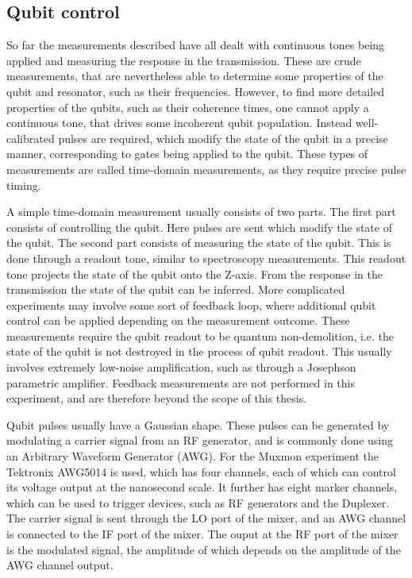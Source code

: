       \subsection{Qubit control}
        \label{ssec:qubit control}
        So far the measurements described have all dealt with continuous tones being applied and measuring the response in the transmission. These are crude measurements, that are nevertheless able to determine some properties of the qubit and resonator, such as their frequencies. However, to find more detailed properties of the qubits, such as their coherence times, one cannot apply a continuous tone, that drives some incoherent qubit population. Instead well-calibrated pulses are required, which modify the state of the qubit in a precise manner, corresponding to gates being applied to the qubit. These types of measurements are called time-domain measurements, as they require precise pulse timing.

        A simple time-domain measurement usually consists of two parts. The first part consists of controlling the qubit. Here pulses are sent which modify the state of the qubit. The second part consists of measuring the state of the qubit. This is done through a readout tone, similar to spectroscopy measurements. This readout tone projects the state of the qubit onto the Z-axis. From the response in the transmission the state of the qubit can be inferred. More complicated experiments may involve some sort of feedback loop, where additional qubit control can be applied depending on the measurement outcome. These measurements require the qubit readout to be quantum non-demolition, i.e. the state of the qubit is not destroyed in the process of qubit readout. This usually involves extremely low-noise amplification, such as through a Josephson parametric amplifier. Feedback measurements are not performed in this experiment, and are therefore beyond the scope of this thesis.

        Qubit pulses usually have a Gaussian shape. These pulses can be generated by modulating a carrier signal from an RF generator, and is commonly done using an Arbitrary Waveform Generator (AWG). For the Muxmon experiment the Tektronix AWG5014 is used, which has four channels, each of which can control its voltage output at the nanosecond scale. It further has eight marker channels, which can be used to trigger devices, such as RF generators and the Duplexer. The carrier signal is sent through the LO port of the mixer, and an AWG channel is connected to the IF port of the mixer. The ouput at the RF port of the mixer is the modulated signal, the amplitude of which depends on the amplitude of the AWG channel output.

